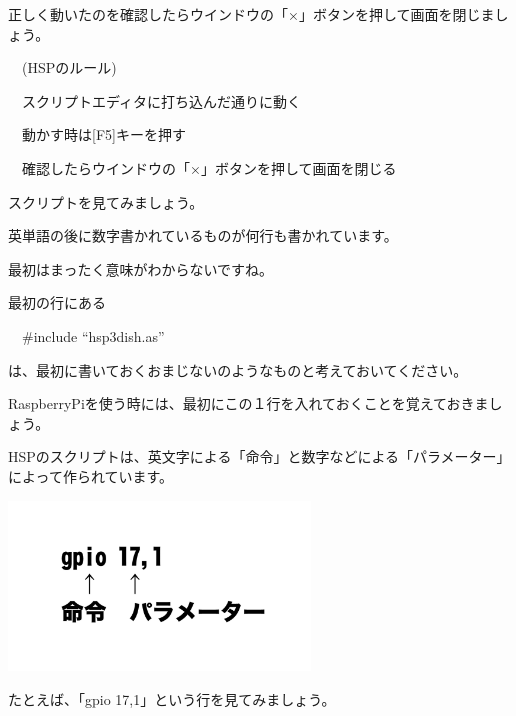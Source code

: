 \documentclass[a4paper,12pt]{jarticle}
\begin{document}
\bigskip
\bigskip
\bigskip

正しく動いたのを確認したらウインドウの「×」ボタンを押して画面を閉じましょう。


\bigskip

\ \ (HSPのルール)


\bigskip

\ \ スクリプトエディタに打ち込んだ通りに動く

\ \ 動かす時は[F5]キーを押す

\ \ 確認したらウインドウの「×」ボタンを押して画面を閉じる


\bigskip

スクリプトを見てみましょう。

英単語の後に数字書かれているものが何行も書かれています。

最初はまったく意味がわからないですね。

\bigskip

最初の行にある


\bigskip

\ \ \#include “hsp3dish.as”


\bigskip

は、最初に書いておくおまじないのようなものと考えておいてください。

RaspberryPiを使う時には、最初にこの１行を入れておくことを覚えておきましょう。


\bigskip

HSPのスクリプトは、英文字による「命令」と数字などによる「パラメーター」によって作られています。

\bigskip
\bigskip

\begin{minipage}{9.781cm}
\centering
{\upshape
\includegraphics[keepaspectratio,width=8.017cm,height=4.512cm]{text02-img/text02-img024.png}}
\end{minipage}

\bigskip
\bigskip
\bigskip

たとえば、「gpio 17,1」という行を見てみましょう。

\bigskip
\end{document}

